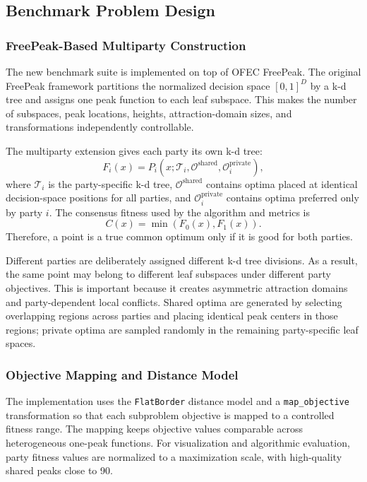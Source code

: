 \documentclass[12pt,a4paper]{article}
\newcommand{\code}[1]{\texttt{#1}}
\begin{document}
\subsection{Benchmark Problem Design}

\subsubsection{FreePeak-Based Multiparty Construction}

The new benchmark suite is implemented on top of OFEC FreePeak. The original FreePeak
framework partitions the normalized decision space $[0,1]^D$ by a k-d tree and assigns
one peak function to each leaf subspace. This makes the number of subspaces, peak
locations, heights, attraction-domain sizes, and transformations independently
controllable.

The multiparty extension gives each party its own k-d tree:
\begin{equation}
  F_i(x) = P_i(x;\mathcal{T}_i,\mathcal{O}^{\mathrm{shared}},
  \mathcal{O}^{\mathrm{private}}_i),
\end{equation}
where $\mathcal{T}_i$ is the party-specific k-d tree, $\mathcal{O}^{\mathrm{shared}}$
contains optima placed at identical decision-space positions for all parties, and
$\mathcal{O}^{\mathrm{private}}_i$ contains optima preferred only by party $i$.
The consensus fitness used by the algorithm and metrics is
\begin{equation}
  C(x)=\min(F_0(x),F_1(x)).
\end{equation}
Therefore, a point is a true common optimum only if it is good for both parties.

Different parties are deliberately assigned different k-d tree divisions. As a result, the
same point may belong to different leaf subspaces under different party objectives. This
is important because it creates asymmetric attraction domains and party-dependent local
conflicts. Shared optima are generated by selecting overlapping regions across parties and
placing identical peak centers in those regions; private optima are sampled randomly in
the remaining party-specific leaf spaces.

\subsubsection{Objective Mapping and Distance Model}

The implementation uses the \code{FlatBorder} distance model and a \code{map\_objective}
transformation so that each subproblem objective is mapped to a controlled fitness range.
The mapping keeps objective values comparable across heterogeneous one-peak functions.
For visualization and algorithmic evaluation, party fitness values are normalized to a
maximization scale, with high-quality shared peaks close to 90.
\end{document}
